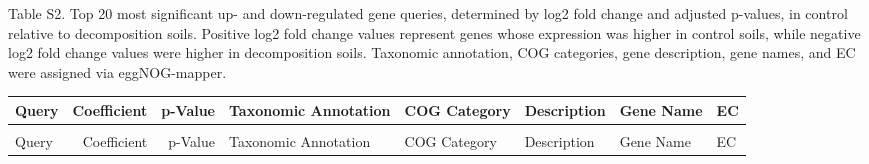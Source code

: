 \documentclass[
  letterpaper,
  DIV=11,
  numbers=noendperiod]{scrartcl}
\begin{document}
\begin{landscape}

Table S2. Top 20 most significant up- and down-regulated gene queries,
determined by log2 fold change and adjusted p-values, in control
relative to decomposition soils. Positive log2 fold change values
represent genes whose expression was higher in control soils, while
negative log2 fold change values were higher in decomposition soils.
Taxonomic annotation, COG categories, gene description, gene names, and
EC were assigned via eggNOG-mapper.

\begin{longtable*}[t]{>{\raggedright\arraybackslash}p{6em}rrl>{\raggedright\arraybackslash}p{4em}>{\raggedright\arraybackslash}p{8em}>{\raggedright\arraybackslash}p{4em}>{\raggedright\arraybackslash}p{5em}}
\toprule
Query & Coefficient & p-Value & Taxonomic Annotation & COG Category & Description & Gene Name & EC\\
\midrule
\endfirsthead
{}\\
\toprule
Query & Coefficient & p-Value & Taxonomic Annotation & COG Category & Description & Gene Name & EC\\
\midrule
\endhead


\end{longtable*}
\end{landscape}
\end{document}
